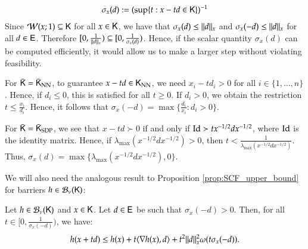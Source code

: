 \begin{equation}
\label{eq:sigma_def}
\sigma_x(d):= (\sup \{ t: x -t d \in \mathsf{K}\})^{-1}
\end{equation}
Since $\mathcal{W}(x;1) \subseteq\mathsf{K}$ for all $x\in\mathsf{K}$, we have that $\sigma_x(d) \leq \lVert d\rVert_{x}$ and $\sigma_{x}(-d)\leq\lVert d\rVert_{x}$ for all $d\in\mathsf{E}$. Therefore $[0,\frac{1}{\lVert d\rVert_{x}})\subseteq [0,\frac{1}{\sigma_{x}(d)})$. Hence, if the scalar quantity $\sigma_{x}(d)$ can be computed efficiently, it would allow us to make a larger step without violating feasibility.%
\begin{example}
For $\bar{\mathsf{K}}=\bar{\mathsf{K}}_{\text{NN}}$, to guarantee $x-td\in\mathsf{K}_{\text{NN}}$, we need $x_{i}-t d_{i}>0$ for all $i\in\{1,\ldots,n\}$. Hence, if $d_{i}\leq 0$, this is satisfied for all $t\geq 0$. If $d_{i}>0$, we obtain the restriction $t\leq \frac{x_{i}}{d_{i}}$. Hence, it follows that $\sigma_{x}(-d)=\max\{\frac{d_{i}}{x_{i}}:d_{i}>0\}$. 
\close
\end{example}
\begin{example}
For $\bar{\mathsf{K}}=\bar{\mathsf{K}}_{\text{SDP}}$, we see that $x-td\succ 0$ if and only if $\operatorname{Id}\succ t x^{-1/2}dx^{-1/2}$, where $\operatorname{Id}$ is the identity matrix. Hence, if $\lambda_{\max}(x^{-1/2}dx^{-1/2})>0$, then $t<\frac{1}{\lambda_{\max}(x^{-1/2}dx^{-1/2})}$. Thus, $\sigma_{x}(d)=\max\{\lambda_{\max}(x^{-1/2}dx^{-1/2}),0\}$.
\close
\end{example}
\noindent
We will also need the analogous result to Proposition \ref{prop:SCF_upper_bound} for barriers $h\in\mathcal{B}_{\nu}(\mathsf{K})$:
\begin{proposition}
\label{prop:SSB_upper_bound}
Let $h\in\mathcal{B}_{\nu}(\mathsf{K})$ and $x \in\mathsf{K}$. Let $d \in \mathsf{E}$ be such that $\sigma_x(-d)>0$. Then, for all $t \in [0,\frac{1}{\sigma_x(-d)})$, we have:
\begin{equation}
\label{eq:SSB_upper_bound} 
h(x + t d) \leq h(x) + t \langle\nabla h(x),d\rangle + t^2 \lVert d\rVert_x^2 \omega(t \sigma_x(-d)).
\end{equation}
\end{proposition}

